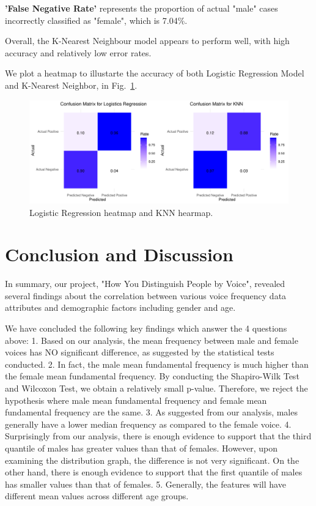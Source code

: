 \documentclass{article}
\begin{document}
	\textbf{'False Negative Rate'} represents the proportion of actual "male" cases incorrectly classified as "female", which is 7.04\%.
	
	Overall, the K-Nearest Neighbour model appears to perform well, with high accuracy and relatively low error rates.
	
	We plot a heatmap to illustarte the accuracy of both Logistic Regression Model and K-Nearest Neighbor, in Fig.~\ref{logistic}.
	\begin{figure}
		\centering
		\includegraphics[width=\textwidth]{graphs/heatmaps.pdf}
		\caption{Logistic Regression heatmap and KNN hearmap.}
		\label{logistic}
	\end{figure}
	
	\section{Conclusion and Discussion}
	
	In summary, our project, "How You Distinguish People by Voice", revealed several findings about the correlation between various voice frequency data attributes and demographic factors including gender and age. 
	
	We have concluded the following key findings which answer the 4 questions above:
	1. Based on our analysis, the mean frequency between male and female voices has NO significant difference, as suggested by the statistical tests conducted.
	2. In fact, the male mean fundamental frequency is much higher than the female mean fundamental frequency. By conducting the Shapiro-Wilk Test and Wilcoxon Test, we obtain a relatively small p-value. Therefore, we reject the hypothesis where male mean fundamental frequency and female mean fundamental frequency are the same.
	3. As suggested from our analysis, males generally have a lower median frequency as compared to the female voice.
	4. Surprisingly from our analysis, there is enough evidence to support that the third quantile of males has greater values than that of females. However, upon examining the distribution graph, the difference is not very significant. On the other hand, there is enough evidence to support that the first quantile of males has smaller values than that of females.
	5. Generally, the features will have different mean values across different age groups.
	
\end{document}
